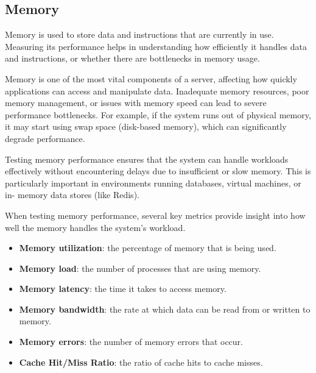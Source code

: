 \subsection{Memory}

Memory is used to store data and instructions that are currently in use. Measuring its performance helps in understanding how efficiently it handles data and instructions, or whether there are bottlenecks in memory usage.

Memory is one of the most vital components of a server,
affecting how quickly applications can access and manipulate
data. Inadequate memory resources, poor memory
management, or issues with memory speed can lead to severe
performance bottlenecks. For example, if the system runs out of
physical memory, it may start using swap space (disk-based
memory), which can significantly degrade performance.

Testing memory performance ensures that the system can handle workloads
effectively without encountering delays due to insufficient or slow memory. This is
particularly important in environments running databases, virtual machines, or in-
memory data stores (like Redis).

When testing memory performance, several key metrics provide insight into how well the memory handles the system's workload.
\begin{itemize}
    \item \textbf{Memory utilization}: the percentage of memory that is being used.
    \item \textbf{Memory load}: the number of processes that are using memory.
    \item \textbf{Memory latency}: the time it takes to access memory.
    \item \textbf{Memory bandwidth}: the rate at which data can be read from or written to memory.
    \item \textbf{Memory errors}: the number of memory errors that occur.
    \item \textbf{Cache Hit/Miss Ratio}: the ratio of cache hits to cache misses.
\end{itemize}

